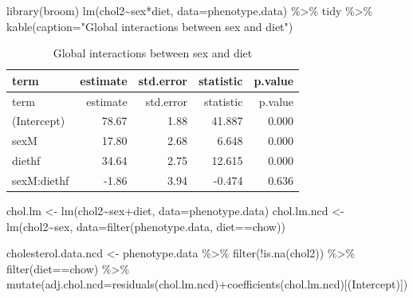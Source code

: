 \documentclass[
]{article}
\newenvironment{Shaded}{\begin{snugshade}}{\end{snugshade}}
\newcommand{\AttributeTok}[1]{\textcolor[rgb]{0.77,0.63,0.00}{#1}}
\newcommand{\FunctionTok}[1]{\textcolor[rgb]{0.00,0.00,0.00}{#1}}
\newcommand{\NormalTok}[1]{#1}
\newcommand{\OtherTok}[1]{\textcolor[rgb]{0.56,0.35,0.01}{#1}}
\newcommand{\SpecialCharTok}[1]{\textcolor[rgb]{0.00,0.00,0.00}{#1}}
\newcommand{\StringTok}[1]{\textcolor[rgb]{0.31,0.60,0.02}{#1}}
\begin{document}
\begin{Shaded}
\begin{Highlighting}[]
\FunctionTok{library}\NormalTok{(broom)}
\FunctionTok{lm}\NormalTok{(chol2}\SpecialCharTok{\textasciitilde{}}\NormalTok{sex}\SpecialCharTok{*}\NormalTok{diet, }\AttributeTok{data=}\NormalTok{phenotype.data) }\SpecialCharTok{\%\textgreater{}\%}
\NormalTok{  tidy }\SpecialCharTok{\%\textgreater{}\%}
  \FunctionTok{kable}\NormalTok{(}\AttributeTok{caption=}\StringTok{"Global interactions between sex and diet"}\NormalTok{)}
\end{Highlighting}
\end{Shaded}

\begin{longtable}[]{@{}lrrrr@{}}
\caption{Global interactions between sex and diet}\tabularnewline
\toprule()
term & estimate & std.error & statistic & p.value \\
\midrule()
\endfirsthead
\toprule()
term & estimate & std.error & statistic & p.value \\
\midrule()
\endhead
(Intercept) & 78.67 & 1.88 & 41.887 & 0.000 \\
sexM & 17.80 & 2.68 & 6.648 & 0.000 \\
diethf & 34.64 & 2.75 & 12.615 & 0.000 \\
sexM:diethf & -1.86 & 3.94 & -0.474 & 0.636 \\
\bottomrule()
\end{longtable}

\begin{Shaded}
\begin{Highlighting}[]
\NormalTok{chol.lm }\OtherTok{\textless{}{-}} \FunctionTok{lm}\NormalTok{(chol2}\SpecialCharTok{\textasciitilde{}}\NormalTok{sex}\SpecialCharTok{+}\NormalTok{diet, }\AttributeTok{data=}\NormalTok{phenotype.data)}
\NormalTok{chol.lm.ncd }\OtherTok{\textless{}{-}} \FunctionTok{lm}\NormalTok{(chol2}\SpecialCharTok{\textasciitilde{}}\NormalTok{sex, }\AttributeTok{data=}\FunctionTok{filter}\NormalTok{(phenotype.data, diet}\SpecialCharTok{==}\StringTok{\textquotesingle{}chow\textquotesingle{}}\NormalTok{))}

\NormalTok{cholesterol.data.ncd }\OtherTok{\textless{}{-}}
\NormalTok{  phenotype.data }\SpecialCharTok{\%\textgreater{}\%}
  \FunctionTok{filter}\NormalTok{(}\SpecialCharTok{!}\FunctionTok{is.na}\NormalTok{(chol2)) }\SpecialCharTok{\%\textgreater{}\%}
  \FunctionTok{filter}\NormalTok{(diet}\SpecialCharTok{==}\StringTok{\textquotesingle{}chow\textquotesingle{}}\NormalTok{) }\SpecialCharTok{\%\textgreater{}\%}
  \FunctionTok{mutate}\NormalTok{(}\AttributeTok{adj.chol.ncd=}\FunctionTok{residuals}\NormalTok{(chol.lm.ncd)}\SpecialCharTok{+}\FunctionTok{coefficients}\NormalTok{(chol.lm.ncd)[}\StringTok{\textquotesingle{}(Intercept)\textquotesingle{}}\NormalTok{])}
\end{Highlighting}
\end{Shaded}
\end{document}
